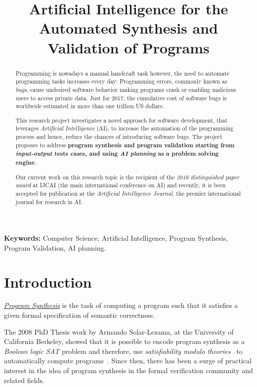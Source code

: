\documentclass[10pt,a4paper]{paper}
\title{Artificial Intelligence for the Automated Synthesis and Validation of Programs}
\begin{document}
\maketitle

\begin{abstract}
  Programming is nowadays a manual handcraft task however, the need to automate programming tasks increases every day: Programming errors, commonly known as {\em bugs}, cause undesired software behavior making programs crash or enabling malicious users to access private data. Just for 2017, the cumulative cost of software bugs is worldwide estimated in more than one trillion US dollars. 

  This research project investigates a novel approach for software development, that leverages {\em Artificial Intelligence} (AI), to increase the automation of the programming process and hence, reduce the chances of introducing software bugs. The project proposes to address {\bf program synthesis and program validation starting from {\em input-output} tests cases, and using {\em AI planning} as a problem solving engine}.

  Our current work on this research topic is the recipient of the {\em 2016 distinguished paper award} at {\sc IJCAI} (the main international conference on AI) and recently, it is been accepted for publication at the {\em Artificial Intelligence Journal}, the premier international journal for research in AI. 

\end{abstract}
{\footnotesize {\bf Keywords:} Computer Science, Artificial Intelligence, Program Synthesis, Program Validation, AI planning.}



\section{Introduction}
\label{sec:introduction}

{\underline{\em Program Synthesis}} is the task of computing a program such that it satisfies a given formal specification of semantic correctness.

The 2008 PhD Thesis work by Armando Solar-Lezama, at the University of California Berkeley, showed that it is possible to encode program synthesis as a {\em Boolean logic SAT} problem and therefore, use {\em satisfiability modulo theories}~\cite{barrett:SMT:2009} to automatically compute programs~\cite{lezama2008program}. Since then, there has been a surge of practical interest in the idea of program synthesis in the formal verification community and related fields.
\end{document}
